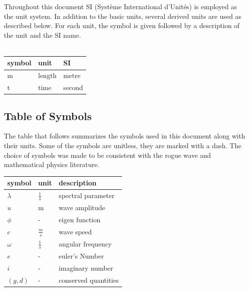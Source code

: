 \documentclass[12pt]{article}
\begin{document}
Throughout this document SI (Syst\`{e}me International d'Unit\'{e}s) is employed
as the unit system.  In addition to the basic units, several derived units are
used as described below.  For each unit, the symbol is given followed by a
description of the unit and the SI name. \\

~\newline

\renewcommand{\arraystretch}{1.2}
  \noindent \begin{tabular}{l l l} 
    \toprule		
    \textbf{symbol} & \textbf{unit} & \textbf{SI}\\
    \midrule 
    \si{\metre} & length & metre\\
    t & time & second\\
    \bottomrule
  \end{tabular}


\subsection{Table of Symbols}

The table that follows summarizes the symbols used in this document along with
their units. Some of the symbols are unitless, 
they are marked with a dash. The choice of symbols was made to be consistent 
with the rogue 
wave and mathematical physics literature.  

\renewcommand{\arraystretch}{1.2}
\noindent \begin{longtable*}{l l p{12cm}} \toprule
\textbf{symbol} & \textbf{unit} & \textbf{description}\\
\midrule 
$\lambda$ & $\frac{1}{s}$ & spectral parameter
\\
$u$ & m & wave amplitude 
\\  
$\phi$ & - & eigen function
\\ 
$c$ & $\frac{m}{s}$ & wave speed 
\\
$\omega$ & $\frac{1}{s}$ & angular frequency 
\\ 
$e$ & - & euler's Number \\ 
$i$ & - & imaginary number\\ 
$(g,d)$ & - & conserved quantities\\
  
\bottomrule
\end{longtable*}
\end{document}
